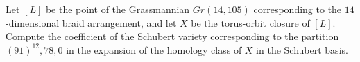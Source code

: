 Let $[L]$ be the point of the Grassmannian $Gr(14, 105)$ corresponding to the $14$-dimensional braid arrangement, and let $X$ be the torus-orbit closure of $[L]$. Compute the coefficient of the Schubert variety corresponding to the partition $(91)^{12}, 78, 0$ in the expansion of the homology class of $X$ in the Schubert basis.
